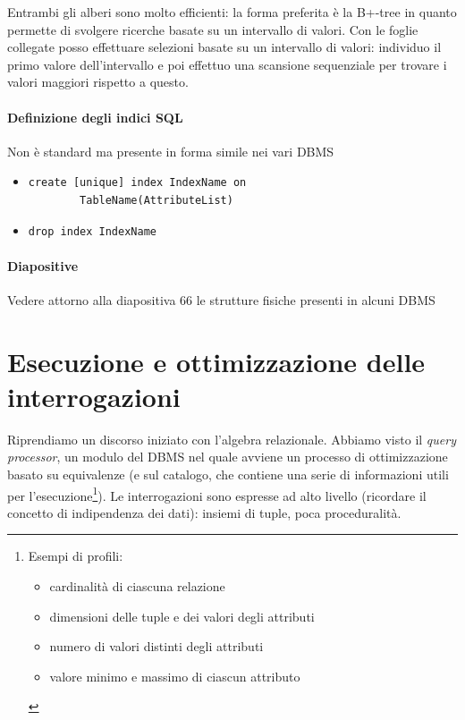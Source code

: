 Entrambi gli alberi sono molto efficienti: la forma preferita è la B+-tree in quanto permette di svolgere ricerche basate su un intervallo di valori. Con le foglie collegate posso effettuare selezioni basate su un intervallo di valori: individuo il primo valore dell'intervallo e poi effettuo una scansione sequenziale per trovare i valori maggiori rispetto a questo.
\paragraph{Definizione degli indici SQL}
Non è standard ma presente in forma simile nei vari DBMS
\begin{itemize}
	\item \begin{verbatim}create [unique] index IndexName on
		TableName(AttributeList)\end{verbatim}
	\item \begin{verbatim}drop index IndexName\end{verbatim}
\end{itemize}
\paragraph{Diapositive} Vedere attorno alla diapositiva 66 le strutture fisiche presenti in alcuni DBMS

\section{Esecuzione e ottimizzazione delle interrogazioni}
Riprendiamo un discorso iniziato con l'algebra relazionale. Abbiamo visto il \emph{query processor}, un modulo del DBMS nel quale avviene un processo di ottimizzazione basato su equivalenze (e sul catalogo, che contiene una serie di informazioni utili per l'esecuzione\footnote{Esempi di profili:\begin{itemize}\item cardinalità di ciascuna relazione \item dimensioni delle tuple e dei valori degli attributi \item numero di valori distinti degli attributi \item valore minimo e massimo di ciascun attributo\end{itemize}}). Le interrogazioni sono espresse ad alto livello (ricordare il concetto di indipendenza dei dati): insiemi di tuple, poca proceduralità.
